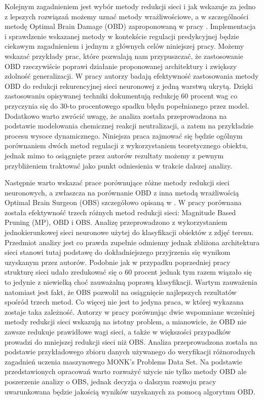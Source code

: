 \par Kolejnym zagadnieniem jest wybór metody redukcji sieci i jak wskazuje \cite{osowskiOBD} za jedno z lepszych rozwiązań możemy uznać metody wrażliwościowe, a w szczególności metodę Optimal Brain Damage (OBD) zaproponowaną w pracy \cite{lecun1989}. Implementacja i sprawdzenie wskazanej metody w kontekście regulacji predykcyjnej będzie ciekawym zagadnieniem i jednym z głównych celów niniejszej pracy. Możemy wskazać przykłady prac, które pozwalają nam przypuszczać, że zastosowanie OBD rzeczywiście poprawi działanie proponowanej architektury i zwiększy zdolność generalizacji. W pracy \cite{chaber2018} autorzy badają efektywność zastosowania metody OBD do redukcji rekurencyjnej sieci neuronowej z jedną warstwą ukrytą. Dzięki zastosowaniu opisywanej techniki dokumentują redukcję 60 procent wag co przyczynia się do 30-to procentowego spadku błędu popełnianego przez model. Dodatkowo warto zwrócić uwagę, że analiza została przeprowadzona na podstawie modelowania chemicznej reakcji neutralizacji, a zatem na przykładzie procesu wysoce dynamicznego. Niniejsza praca zajmować się będzie ogólnym porównaniem dwóch metod regulacji z wykorzystaniem teoretycznego obiektu, jednak mimo to osiągnięte przez autorów rezultaty możemy z pewnym przybliżeniem traktować jako punkt odniesienia w trakcie dalszej analizy.

\par Następnie warto wskazać prace porównujące różne metody redukcji sieci neuronowych, a zwłaszcza na porównanie OBD z inna metodą wrażliwością Optimal Brain Surgeon (OBS) szczegółowo opisaną w \cite{osowskiOBD}. W pracy \cite{kavzoglu1998} porównana została efektywność trzech różnych metod redukcji sieci: Magnitude Based Pruning (MP), OBD i OBS. Analizę przeprowadzono z wykorzystaniem jednokierunkowej sieci neuronowe użytej do klasyfikacji obiektów z zdjęć terenu. Przedmiot analizy jest co prawda
zupełnie odmienny jednak zbliżona architektura sieci stanowi tutaj podstawę do dokładniejszego przyjrzenia się wynikom uzyskanym przez autorów. Podobnie jak w przypadku poprzedniej pracy strukturę sieci udało zredukować się o 60 procent jednak tym razem wiązało się to jedynie z niewielką choć zauważalną poprawą klasyfikacji. Wartym zauważenia natomiast jest fakt, że OBS pozwolił na osiągnięcie najlepszych rezultatów spośród trzech metod. Co więcej nie jest to jedyna praca, w której wykazana zostaje taka zależność. Autorzy w pracy \cite{hassibi1993} porównując dwie wspomniane wcześniej metody redukcji sieci wskazują na istotny problem, a mianowicie, że OBD nie zawsze redukuje prawidłowe wagi sieci, a także w większości przypadków prowadzi do mniejszej redukcji sieci niż OBS. Analiza przeprowadzona została na podstawie przykładowego zbioru danych używanego do weryfikacji różnorodnych zagadnień uczenia maszynowego MONK's Problems Data Set. Na podstawie przedstawionych opracowań warto
rozważyć użycie nie tylko metody OBD ale poszerzenie analizy o OBS, jednak decyzja o dalszym rozwoju pracy uwarunkowana będzie jakością wyników uzyskanych za pomocą algorytmu OBD.

